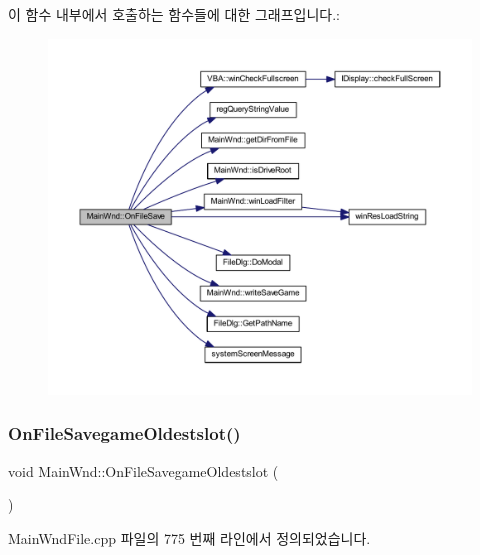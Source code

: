 이 함수 내부에서 호출하는 함수들에 대한 그래프입니다.\+:
\nopagebreak
\begin{figure}[H]
\begin{center}
\leavevmode
\includegraphics[width=350pt]{class_main_wnd_a962abbb99f5b6bba3f05ba043358584e_cgraph}
\end{center}
\end{figure}
\mbox{\label{class_main_wnd_a946615293a97e8d381bb34bee4d7ff24}} 
\subsubsection{\texorpdfstring{On\+File\+Savegame\+Oldestslot()}{OnFileSavegameOldestslot()}}
{\footnotesize\ttfamily void Main\+Wnd\+::\+On\+File\+Savegame\+Oldestslot (\begin{DoxyParamCaption}{ }\end{DoxyParamCaption})\hspace{0.3cm}{\ttfamily [protected]}}



Main\+Wnd\+File.\+cpp 파일의 775 번째 라인에서 정의되었습니다.


